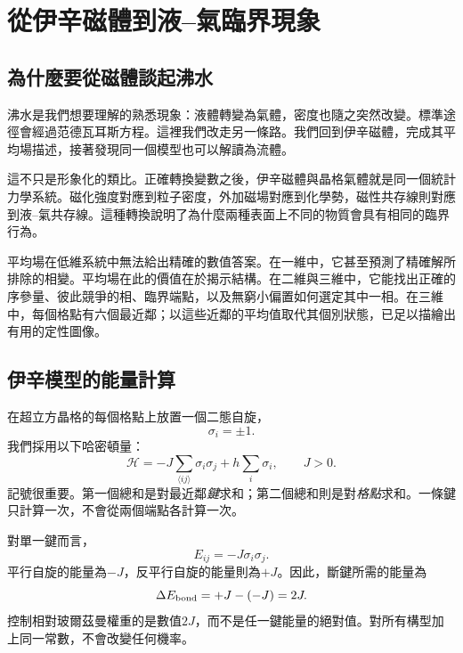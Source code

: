 \chapter{從伊辛磁體到液--氣臨界現象}


\section{為什麼要從磁體談起沸水}

沸水是我們想要理解的熟悉現象：液體轉變為氣體，密度也隨之突然改變。標準途徑會經過范德瓦耳斯方程。這裡我們改走另一條路。我們回到伊辛磁體，完成其平均場描述，接著發現同一個模型也可以解讀為流體。

這不只是形象化的類比。正確轉換變數之後，伊辛磁體與晶格氣體就是同一個統計力學系統。磁化強度對應到粒子密度，外加磁場對應到化學勢，磁性共存線則對應到液--氣共存線。這種轉換說明了為什麼兩種表面上不同的物質會具有相同的臨界行為。

平均場在低維系統中無法給出精確的數值答案。在一維中，它甚至預測了精確解所排除的相變。平均場在此的價值在於揭示結構。在二維與三維中，它能找出正確的序參量、彼此競爭的相、臨界端點，以及無窮小偏置如何選定其中一相。在三維中，每個格點有六個最近鄰；以這些近鄰的平均值取代其個別狀態，已足以描繪出有用的定性圖像。

\section{伊辛模型的能量計算}

在超立方晶格的每個格點上放置一個二態自旋，
\begin{equation}
\sigma_i=\pm1.
\end{equation}
我們採用以下哈密頓量：
\begin{equation}
\mathcal H
=-J\sum_{\langle ij\rangle}\sigma_i\sigma_j
+h\sum_i\sigma_i,
\qquad J>0.
\label{eq:ising-hamiltonian}
\end{equation}
記號很重要。第一個總和是對最近鄰\emph{鍵}求和；第二個總和則是對\emph{格點}求和。一條鍵只計算一次，不會從兩個端點各計算一次。

對單一鍵而言，
\begin{equation}
E_{ij}=-J\sigma_i\sigma_j.
\end{equation}
平行自旋的能量為\(-J\)，反平行自旋的能量則為\(+J\)。因此，斷鍵所需的能量為
\begin{equation}
\Delta E_{\rm bond}=+J-(-J)=2J.
\label{eq:broken-bond}
\end{equation}
控制相對玻爾茲曼權重的是數值\(2J\)，而不是任一鍵能量的絕對值。對所有構型加上同一常數，不會改變任何機率。

